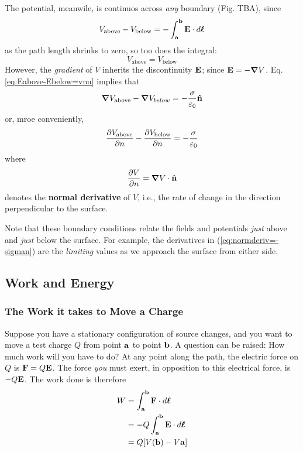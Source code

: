 		The potential, meanwile, is continuos across \textit{any} boundary (Fig. {\color{red}TBA}),
		since
		\begin{equation}
			V_\text{above}
			-
			V_\text{below}
			=
			-\int^{\vb{b}}_{\vb{a}} \vb{E}\cdot\dd{\vb* \ell} 
		\end{equation}
		as the path length shrinks to zero, so too does the integral:
		\begin{equation}
			V_\text{above}
			=
			V_\text{below}
		\end{equation}
		However, the \textit{gradient} of $V$ inherits the discontinuity $\vb E$; since 
		$\vb E = -\grad V$. Eq. \ref{eq:Eabove-Ebelow=vnu} implies that
		\begin{equation}
			\grad V_\text{above}
			- \grad V_{below}
			= 
			-\frac{\sigma}{\varepsilon_0} \vu{n}
		\end{equation}
		or, mroe conveniently,
		\begin{equation}
			\pdv{V_\text{above}}{n} 
			- \pdv{V_\text{below}}{n} 
			= 
			-\frac{\sigma}{\varepsilon_0} 
			\label{eq:normderiv=-sigman}
		\end{equation}
		where
		\begin{equation}
			\pdv{V}{n} = \grad V\cdot \vu{n} 
		\end{equation}
		denotes the \textbf{normal derivative} of $V$, i.e., the rate of change in the direction
		perpendicular to the surface.

		Note that these boundary conditions relate the fields and potentials \textit{just}
		above and \textit{just} below the surface. For example, the derivatives in (\ref{eq:normderiv=-sigman})
		are the \textit{limiting} values as we approach the surface from either side.

	\newpage
\subsection{Work and Energy}
	\subsubsection{The Work it takes to Move a Charge}
		Suppose you have a stationary configuration of source changes, and you want to move
		a test charge $Q$ from point $\vb a$ to point $\vb b$. A question can be raised: 
		How much work will you have to do? At any point along the path, the electric force
		on $Q$ is $\vb F = Q\vb E$. The force \textit{you} must exert, in opposition to this
		electrical force, is $-Q \vb{E}$. The work done is therefore
		\begin{align*}
		    W
			&=
			\int_{\vb{a}}^{\vb{b}} \vb{F}\cdot\dd{\vb* \ell}\\
			&=
			-Q \int_{\vb{a}}^{\vb{b}} \vb{E}\cdot\dd{\vb* \ell}\\
			&=
			Q\bqty{V( \vb{b}) - V \vb{a}}
		\end{align*}

